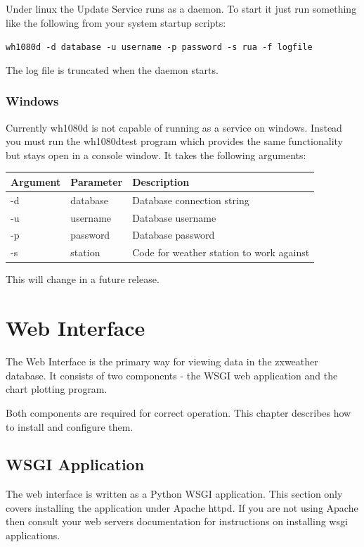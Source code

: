 \documentclass[a4paper,10pt,draft]{book}
\begin{document}
Under linux the Update Service runs as a daemon. To start it just run something like the following from your system startup scripts:

\verb|wh1080d -d database -u username -p password -s rua -f logfile|

The log file is truncated when the daemon starts.

\subsection{Windows}


Currently wh1080d is not capable of running as a service on windows. Instead you must run the wh1080dtest program which provides the same functionality but stays open in a console window. It takes the following arguments:

\begin{tabular}{l l p{10cm}}
\hline
\textbf{Argument} & \textbf{Parameter} & \textbf{Description} \\
\hline
-d & database & Database connection string \\
-u & username & Database username \\
-p & password & Database password \\
-s & station  & Code for weather station to work against \\
\hline
\end{tabular}

This will change in a future release.

\chapter{Web Interface}
\label{cha_web_interface}

The Web Interface is the primary way for viewing data in the zxweather database. It consists of two components - the WSGI web application and the chart plotting program.

Both components are required for correct operation. This chapter describes how to install and configure them.


\section{WSGI Application}

The web interface is written as a Python WSGI application. This section only covers installing the application under Apache httpd. If you are not using Apache then consult your web servers documentation for instructions on installing wsgi applications.
\end{document}

